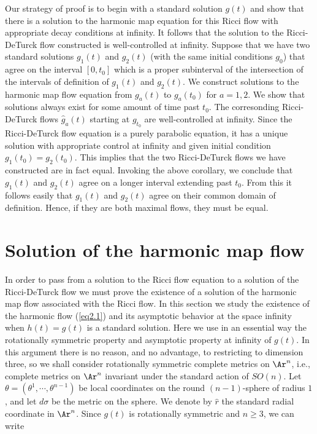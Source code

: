 Our strategy of proof is to begin with a standard solution $g(t)$
and show that there is a solution to the harmonic map equation for
this Ricci flow with appropriate decay conditions at infinity. It
follows that the solution to the Ricci-DeTurck flow constructed is
well-controlled at infinity. Suppose that we have two standard
solutions $g_1(t)$ and $g_2(t)$ (with the same initial conditions
$g_0$) that agree on the interval $[0,t_0]$ which is a proper
subinterval of the intersection of the intervals of definition of
$g_1(t)$ and $g_2(t)$. We construct solutions to the harmonic map
flow equation from $g_a(t)$ to $g_a(t_0)$ for $a=1,2$. We show that
solutions always exist for some amount of time past $t_0$. The
corresonding Ricci-DeTurck flows $\hat g_a(t)$ starting at $g_{t_0}$
are well-controlled at infinity. Since the Ricci-DeTurck flow
equation is a purely parabolic equation, it has a unique solution
with appropriate control at infinity and given initial condition
$g_1(t_0)=g_2(t_0)$. This implies that the two Ricci-DeTurck flows
we have constructed are in fact equal. Invoking the above corollary,
we conclude that $g_1(t)$ and $g_2(t)$ agree on a longer interval
extending  past $t_0$. From this it follows easily that $g_1(t)$ and
$g_2(t)$ agree on their common domain of definition. Hence, if they
are both maximal flows, they must be equal.



\section{Solution of the harmonic map flow}

In order to pass from a solution to the Ricci flow equation to a
solution of the Ricci-DeTurck flow we must prove the existence of a
solution of the harmonic map flow
associated with the Ricci flow. In this section we study the
existence of the harmonic flow (\ref{eq2.1}) and its asymptotic
behavior at the space infinity when $h(t)=g(t)$ is a standard
solution. Here we use in an essential way the rotationally symmetric
property and asymptotic property at infinity of $g(t)$. In this
argument there is no reason, and no advantage, to restricting to
dimension three, so we shall consider rotationally symmetric
complete metrics on $\Ar^n$, i.e., complete metrics on $\Ar^n$
invariant under the standard action of $SO(n)$. Let
$\theta=(\theta^1,\cdots,\theta^{n-1})$ be local coordinates on the
round $(n-1)$-sphere of radius $1$, and let $d\sigma$ be the metric
on the sphere. We denote by $\hat r$ the standard radial coordinate
in $\Ar^n$. Since $g(t)$ is rotationally symmetric and $n \geq 3$,
we can write


